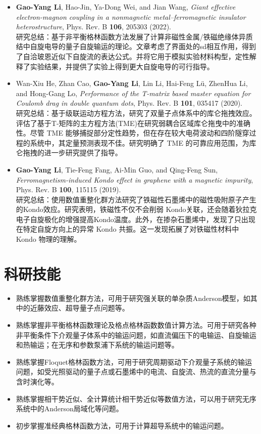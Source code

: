 \documentclass{resume}
\begin{document}
\begin{itemize}
\item \textbf{Gao-Yang Li}, Hao-Jin, Ya-Dong Wei, and Jian Wang, \textit{Giant effective electron-magnon coupling in a nonmagnetic metal–ferromagnetic insulator heterostructure}, Phys. Rev. B \textbf{106}, 205303 (2022).\\
研究总结：基于非平衡格林函数方法发展了计算非磁性金属/铁磁绝缘体异质结中自旋电导的量子自旋输运的理论。文章考虑了界面处的sd相互作用，得到了自洽玻恩近似下自旋流的表达公式。并将它用于模拟实验材料构型，定性解释了实验结果，并提供了实验上得到更大自旋电导的可行指导。
\item Wan-Xiu He, Zhan Cao, \textbf{Gao-Yang Li}, Lin Li, Hai-Feng Lü, ZhenHua Li, and Hong-Gang Lo, \textit{Performance of the T-matrix based master equation for Coulomb drag in double quantum dots}, Phys. Rev. B \textbf{101}, 035417 (2020).\\
研究总结：基于级联运动方程方法，研究了双量子点体系中的库仑拖拽效应。评估了基于T-矩阵的主方程方法(TME)在研究弱耦合区域库仑拖曳中的准确性。尽管 TME 能够捕捉部分定性趋势，但在存在较大电荷波动和四阶隧穿过程的系统中，其定量预测表现不佳。研究明确了 TME 的可靠应用范围，为库仑拖拽的进一步研究提供了指导。
\item \textbf{Gao-Yang Li}, Tie-Feng Fang, Ai-Min Guo, and Qing-Feng Sun, \textit{Ferromagnetism-induced Kondo effect in graphene with a magnetic impurity}, Phys. Rev. B \textbf{100}, 115115 (2019).\\
研究总结：使用数值重整化群方法研究了铁磁性石墨烯中的磁性吸附原子产生的Kondo效应。研究表明，铁磁性不仅不会削弱 Kondo关联，还会随着狄拉克电子自旋极化的增强提高Kondo温度。此外，在掺杂石墨烯中，发现了只出现在特定自旋方向上的异常 Kondo 共振。这一发现拓展了对铁磁性材料中 Kondo 物理的理解。
\end{itemize}

\section{科研技能}
\begin{itemize}%
\item 熟练掌握数值重整化群方法，可用于研究强关联的单杂质Anderson模型，如其中的近藤效应、超导量子点问题等。
\item 熟练掌握非平衡格林函数理论及格点格林函数数值计算方法。可用于研究各种非平衡条件下介观量子体系中的输运问题，如直流偏压下的电输运、自旋输运和热输运；在无序和参数泵浦下系统的输运问题等。
\item 熟练掌握Floquet格林函数方法，可用于研究周期驱动下介观量子系统的输运问题，如受光照驱动的量子点或石墨烯中的电流、自旋流、热流的直流分量与含时演化等。
\item 熟练掌握相干势近似、全计算统计相干势近似等数值方法，可以用于研究无序系统中的Anderson局域化等问题。
\item 初步掌握准经典格林函数方法，可用于计算超导系统中的输运问题。
\end{itemize}
\end{document}
